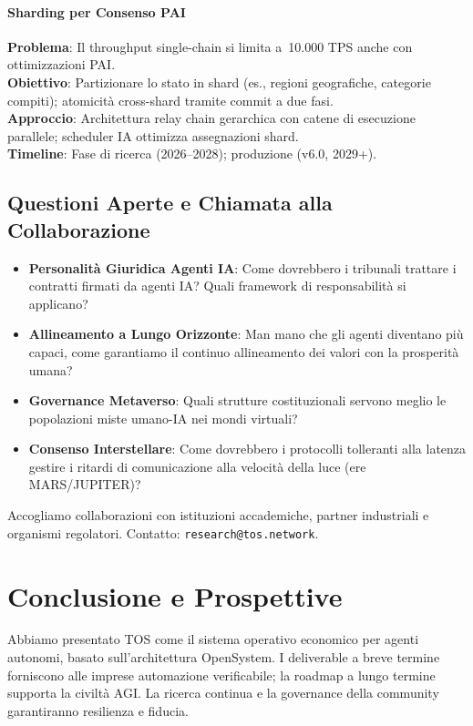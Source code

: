 \documentclass[11pt]{article}
\begin{document}
\begin{itemize}[noitemsep]
\paragraph{Sharding per Consenso PAI}
\textbf{Problema}: Il throughput single-chain si limita a~10.000 TPS anche con ottimizzazioni PAI.\\
\textbf{Obiettivo}: Partizionare lo stato in shard (es., regioni geografiche, categorie compiti); atomicità cross-shard tramite commit a due fasi.\\
\textbf{Approccio}: Architettura relay chain gerarchica con catene di esecuzione parallele; scheduler IA ottimizza assegnazioni shard.\\
\textbf{Timeline}: Fase di ricerca (2026--2028); produzione (v6.0, 2029+).

\subsection{Questioni Aperte e Chiamata alla Collaborazione}

\begin{itemize}[noitemsep]
  \item \textbf{Personalità Giuridica Agenti IA}: Come dovrebbero i tribunali trattare i contratti firmati da agenti IA? Quali framework di responsabilità si applicano?
  \item \textbf{Allineamento a Lungo Orizzonte}: Man mano che gli agenti diventano più capaci, come garantiamo il continuo allineamento dei valori con la prosperità umana?
  \item \textbf{Governance Metaverso}: Quali strutture costituzionali servono meglio le popolazioni miste umano-IA nei mondi virtuali?
  \item \textbf{Consenso Interstellare}: Come dovrebbero i protocolli tolleranti alla latenza gestire i ritardi di comunicazione alla velocità della luce (ere MARS/JUPITER)?
\end{itemize}

Accogliamo collaborazioni con istituzioni accademiche, partner industriali e organismi regolatori. Contatto: \texttt{research@tos.network}.

\section{Conclusione e Prospettive}
Abbiamo presentato TOS come il sistema operativo economico per agenti autonomi, basato sull'architettura OpenSystem. I deliverable a breve termine forniscono alle imprese automazione verificabile; la roadmap a lungo termine supporta la civiltà AGI. La ricerca continua e la governance della community garantiranno resilienza e fiducia.


\end{itemize}
\end{document}
